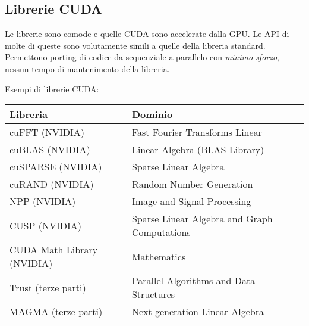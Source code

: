 \subsection{Librerie CUDA}

Le librerie sono comode e quelle CUDA sono accelerate dalla GPU. Le API di molte di queste sono volutamente simili a quelle della libreria standard. Permettono porting di codice da sequenziale a parallelo con \textit{minimo sforzo}, nessun tempo di mantenimento della libreria.

Esempi di librerie CUDA:
\begin{center}
	\begin{tabular}{@{} ll @{}}
		\hline
		\textbf{Libreria}                     & \textbf{Dominio}                                    \\ \hline
		cuFFT (NVIDIA)                        & Fast Fourier Transforms Linear                      \\
		cuBLAS (NVIDIA)                       & Linear Algebra (BLAS Library)                       \\
		cuSPARSE (NVIDIA)                     & Sparse Linear Algebra                               \\
		cuRAND (NVIDIA)                       & Random Number Generation                            \\
		NPP (NVIDIA)                          & Image and Signal Processing                         \\
		CUSP (NVIDIA)                         & Sparse Linear Algebra and Graph Computations        \\
		CUDA Math Library (NVIDIA)            & Mathematics                                         \\
		Trust (terze parti)                   & Parallel Algorithms and Data Structures             \\
		MAGMA (terze parti)                   & Next generation Linear Algebra                      \\ \hline
	\end{tabular}
\end{center}

